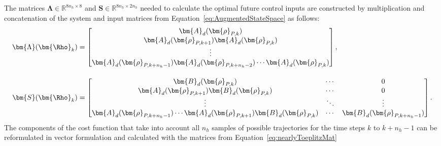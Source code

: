 The matrices \( \bm{\Lambda} \in \mathbb{R}^{8n_h \times 8}\) and \( \bm{S}  \in \mathbb{R}^{8n_h \times 2n_h} \) needed to calculate the optimal future control inputs are constructed by multiplication and concatenation of the system and input matrices from Equation~\eqref{eq:AugmentedStateSpace} as follows: %
\begin{equation} \label{eq:nearlyToeplitzMat}
    \begin{aligned}
        \bm{\Lambda}(\bm{\Rho}_k) &= \begin{bmatrix}
            \bm{A}_d(\bm{\rho}_{P,k})  \\
            \bm{A}_d(\bm{\rho}_{P,k+1}) \bm{A}_d(\bm{\rho}_{P,k})  \\
            \vdots\\
            \bm{A}_d(\bm{\rho}_{P,k+n_h-1}) \bm{A}_d(\bm{\rho}_{P,k+n_h-2}) \cdots \bm{A}_d(\bm{\rho}_{P,k}) 
        \end{bmatrix}, \\[10pt]
        \bm{S}(\bm{\Rho}_k) &= 
        \begin{bmatrix}
            \bm{B}_d(\bm{\rho}_{P,k})  & \cdots & 0 \\
            \bm{A}_d(\bm{\rho}_{P,k+1}) \bm{B}_d(\bm{\rho}_{P,k}) & \cdots & 0 \\
            \vdots &  \ddots & \vdots \\
            \bm{A}_d(\bm{\rho}_{P,k+n_h-1}) \cdots \bm{A}_d(\bm{\rho}_{P,k+1}) \bm{B}_d(\bm{\rho}_{P,k}) & \cdots & \bm{B}_d(\bm{\rho}_{P,k+n_h-1})
        \end{bmatrix}.
    \end{aligned}
\end{equation}
The components of the cost function that take into account all $n_h$ samples of possible trajectories for the time steps $k$ to $k + n_h-1$ can be reformulated in vector formulation and calculated with the matrices from Equation~\eqref{eq:nearlyToeplitzMat} 

